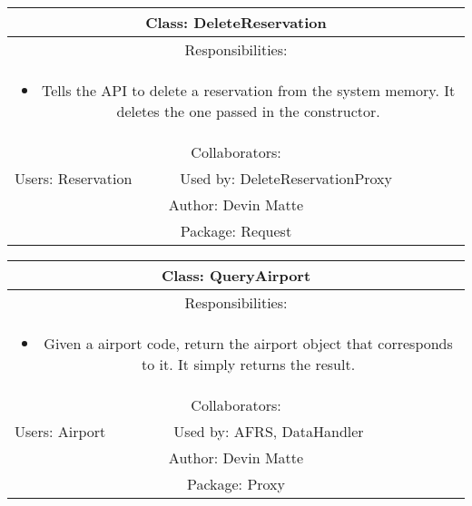 \begin{center}
    \begin{tabular}{ |p{7cm}|p{7cm}|  }
        \hline
        \multicolumn{2}{|c|}{Class: DeleteReservation} \\
        \hline
        \multicolumn{2}{|c|}{Responsibilities:} \\ \multicolumn{2}{|c|}{\parbox{0.9\textwidth}{
        \begin{itemize}
            \item Tells the API to delete a reservation from the system memory.
            It deletes the one passed in the constructor.
        \end{itemize} }} \\
        \hline
        \multicolumn{2}{|c|}{Collaborators:} \\
        \hline
        Users: Reservation & Used by: DeleteReservationProxy \\
        \hline
        \multicolumn{2}{|c|}{Author: Devin Matte} \\
        \hline
        \multicolumn{2}{|c|}{Package: Request} \\
        \hline
    \end{tabular}
\end{center}

\begin{center}
    \begin{tabular}{ |p{7cm}|p{7cm}|  }
        \hline
        \multicolumn{2}{|c|}{Class: QueryAirport} \\
        \hline
        \multicolumn{2}{|c|}{Responsibilities:} \\ \multicolumn{2}{|c|}{\parbox{0.9\textwidth}{
        \begin{itemize}
            \item Given a airport code, return the airport object that corresponds to it. It simply returns the result.
        \end{itemize} }} \\
        \hline
        \multicolumn{2}{|c|}{Collaborators:} \\
        \hline
        Users: Airport & Used by: AFRS, DataHandler \\
        \hline
        \multicolumn{2}{|c|}{Author: Devin Matte} \\
        \hline
        \multicolumn{2}{|c|}{Package: Proxy} \\
        \hline
    \end{tabular}
\end{center}

